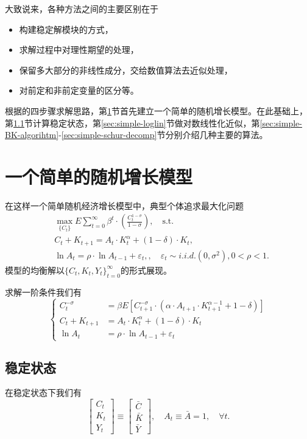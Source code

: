 大致说来，各种方法之间的主要区别在于
\begin{itemize}
  \item 构建稳定解模块的方式，
  \item 求解过程中对理性期望的处理，
  \item 保留多大部分的非线性成分，交给数值算法去近似处理，
  \item 对前定和非前定变量的区分等。
\end{itemize}

根据\cite{King:1988bk, King:1988kf}的四步骤求解思路，第\ref{sec:simple-sto-grow-model}节首先建立一个简单的随机增长模型。在此基础上，第\ref{sec:simple-steady-state}节计算稳定状态，第\ref{sec:simple-loglin}节做对数线性化近似，第\ref{sec:simple-BK-algorihtm}-\ref{sec:simple-schur-decomp}节分别介绍几种主要的算法。

\section{一个简单的随机增长模型}
\label{sec:simple-sto-grow-model}
在这样一个简单随机经济增长模型中，典型个体追求最大化问题
\begin{align*}
  & \max_{\{C_t\}} E \sum_{t=0}^{\infty} \beta^t \cdot \left(\frac{C_t^{1-\sigma}}{1-\sigma}\right), \quad \text{s.t.} \\
& C_t + K_{t+1} = A_t \cdot K_{t}^{\alpha} + (1-\delta) \cdot K_{t}, \\
& \ln A_t = \rho \cdot \ln A_{t-1} + \varepsilon_t, , \quad \varepsilon_{t} \sim i.i.d. (0, \sigma^2), 0<\rho < 1.
\end{align*}
模型的均衡解以$\{C_t,K_t,Y_t\}_{t=0}^{\infty}$的形式展现。

求解一阶条件我们有
\begin{equation*}
  \begin{cases}
    C_t^{-\sigma} &= \beta E \left[
    C_{t+1}^{-\sigma} \cdot \left(\alpha \cdot A_{t+1} \cdot K_{t+1}^{\alpha - 1} + 1 - \delta \right)
    \right] \\
    C_t + K_{t+1} &= A_t \cdot K_t^{\alpha} + (1-\delta) \cdot K_t \\
    \ln A_t &= \rho \cdot \ln A_{t-1} + \varepsilon_t
  \end{cases}
\end{equation*}

\subsection{稳定状态}
\label{sec:simple-steady-state}
在稳定状态下我们有
\begin{equation*}
  \begin{bmatrix}
    C_t \\
    K_t \\
    Y_t
  \end{bmatrix} \equiv
  \begin{bmatrix}
    \bar{C} \\
    \bar{K} \\
    \bar{Y}
    \end{bmatrix}, \quad A_t \equiv \bar{A} = 1, \quad \forall t.
\end{equation*}

